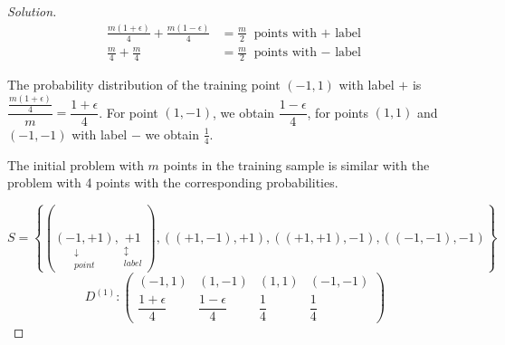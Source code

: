 \documentclass{article}
\newcommand{\<}{\langle}
\renewcommand{\>}{\rangle}
\theoremstyle{definition}
\newcommand{\usub}[2]{\underset{\substack{#1}}{#2}}
\newcommand{\col}{\colon}
\newcommand{\dso}{D^{(1)}}
\begin{document}
\begin{proof}[Solution]

\phantom{.}

\noindent
\begin{minipage}{0.5\textwidth}
\end{minipage}%
\begin{minipage}{0.5\textwidth}
\begin{align*}
\frac{m(1+\epsilon)}{4} + \frac{m(1-\epsilon)}{4} &= \frac{m}{2} \text{ points with $+$ label}\\
\frac{m}{4} + \frac{m}{4} &= \frac{m}{2} \text{ points with $-$ label}
\end{align*}
\end{minipage}

The probability distribution of the training point $(-1, 1)$ with label $+$ is
$\dfrac{\frac{m(1+\epsilon)}{4}}{m} = \dfrac{1+\epsilon}{4}$. For point $(1, -1)$, we obtain
$\dfrac{1-\epsilon}{4}$, for points $(1, 1)$ and $(-1, -1)$ with label $-$ we obtain
$\frac{1}{4}$.

The initial problem with $m$ points in the training sample is similar with the problem
with 4 points with the corresponding probabilities.

\[S = \left\{(\usub{\downarrow\\point}{(-1, +1)}, \usub{\updownarrow\\label}{+1}),
             ((+1, -1), +1), ((+1, +1), -1), ((-1, -1), -1)
      \right\}\]
\[
\dso \col \left(
\begin{array}{cccc}
(-1, 1) & (1, -1) & (1, 1) & (-1, -1) \\
\dfrac{1+\epsilon}{4} & \dfrac{1-\epsilon}{4} & \dfrac{1}{4} & \dfrac{1}{4}
\end{array}
\right)
\]


\end{proof}
\end{document}
